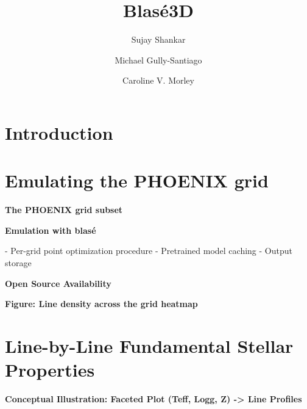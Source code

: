 \documentclass[twocolumn]{aastex631}
\begin{document}
\title{Blas\'e3D}

\author[0000-0002-2290-6810]{Sujay Shankar}
\author[0000-0002-4020-3457]{Michael Gully-Santiago}
\author[0000-0002-4404-0456]{Caroline V. Morley}

\begin{abstract}
    \blindtext
\end{abstract}

\keywords{}


\section{Introduction}
\blindtext


\section{Emulating the PHOENIX grid}

\begin{mdframed}
    \textbf{The PHOENIX grid subset}

    \textcolor{lightgray}{\blindtext}
\end{mdframed}

\begin{mdframed}
    \textbf{Emulation with blas\'e}

    - Per-grid point optimization procedure
    - Pretrained model caching
    - Output storage

    \textcolor{lightgray}{\blindtext}
\end{mdframed}

\begin{mdframed}
    \textbf{Open Source Availability}

    \textcolor{lightgray}{\blindtext}
\end{mdframed}

\begin{mdframed}
    \textbf{Figure: Line density across the grid heatmap}
\end{mdframed}


\section{Line-by-Line Fundamental Stellar Properties}
\begin{mdframed}
    \textbf{Conceptual Illustration: Faceted Plot (Teff, Logg, Z) -> Line Profiles}
\end{mdframed}
\end{document}
